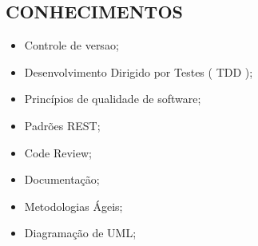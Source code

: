 \begin{framed}
  \section{CONHECIMENTOS}
  \begin{itemize}
    \item Controle de versao;
    \item Desenvolvimento Dirigido por Testes ( TDD );
    \item Princípios de qualidade de software;
    \item Padrões REST;
    \item Code Review;
    \item Documentação;
    \item Metodologias Ágeis;
    \item Diagramação de UML;
  \end{itemize}
\end{framed}